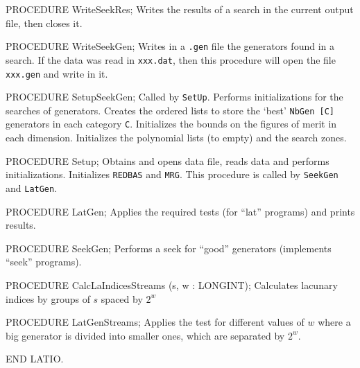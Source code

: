 PROCEDURE WriteSeekRes;
\endcode
 \tab
   Writes the results of a search in the current output file,
   then closes it.
 \endtab
\code

PROCEDURE WriteSeekGen;
\endcode
 \tab
   Writes in a {\tt .gen} file the generators found in a search.
   If the data was read in {\tt xxx.dat}, then this procedure
   will open the file {\tt xxx.gen} and write in it.
 \endtab
\code

PROCEDURE SetupSeekGen;
\endcode
 \tab
  Called by {\tt SetUp}.
  Performs initializations for the searches of generators.
  Creates the ordered lists to store the `best' {\tt NbGen [C]}
  generators in each category {\tt C}.
  Initializes the bounds on the figures of merit in each dimension.
  Initializes the polynomial lists (to empty) and the search zones.
 \endtab
\code

PROCEDURE Setup;
\endcode
 \tab
  Obtains and opens data file, reads data and performs initializations.
  Initializes {\tt REDBAS} and {\tt MRG}.
  This procedure is called by {\tt SeekGen} and {\tt LatGen}.
 \endtab
\code

PROCEDURE LatGen;
\endcode
 \tab  Applies the required tests 
   (for ``lat'' programs) and prints results.
 \endtab
\code

PROCEDURE SeekGen;
\endcode
 \tab  Performs a seek for ``good'' generators 
   (implements ``seek'' programs).
 \endtab
\code

PROCEDURE CalcLaIndicesStreams (s, w : LONGINT);
\endcode
 \tab Calculates lacunary indices by groups of $s$ spaced by $2^w$
 \endtab 
\code

PROCEDURE LatGenStreams;
\endcode
 \tab  Applies the test for different values of $w$ where a big generator
  is divided into smaller ones, which are separated by $2^w$. 
 \endtab 
\code 

END LATIO.
\endcode








